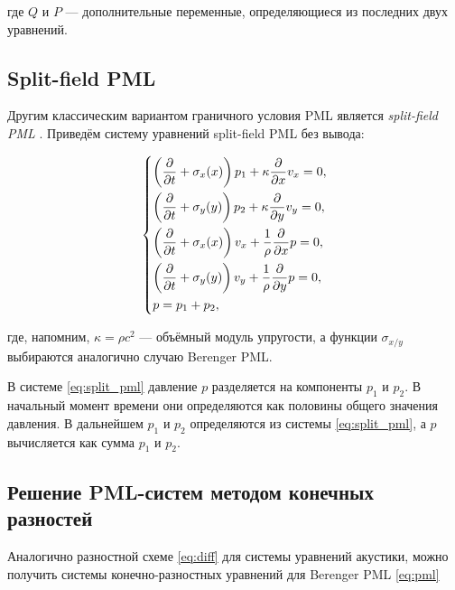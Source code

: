 \noindent где $Q$ и $P$ --- дополнительные переменные, определяющиеся из последних двух уравнений.
    
\subsection{Split-field PML}

Другим классическим вариантом граничного условия PML является  \textit{split-field PML} \cite{split_field_pml}. Приведём систему уравнений split-field PML без вывода:

\begin{equation}
	\begin{dcases}
	    \left(\frac{\partial}{\partial t} + \sigma_x(x)\right) p_1 + \kappa \frac{\partial}{\partial x} v_x = 0 , \\
	    \left(\frac{\partial}{\partial t} + \sigma_y(y)\right) p_2 + \kappa \frac{\partial}{\partial y} v_y = 0 , \\
	    \left(\frac{\partial}{\partial t} + \sigma_x(x)\right) v_x + \frac{1}{\rho} \frac{\partial}{\partial x} p = 0 , \\
	    \left(\frac{\partial}{\partial t} + \sigma_y(y)\right) v_y + \frac{1}{\rho} \frac{\partial}{\partial y} p = 0 , \\
	    p = p_1 + p_2 ,
	\end{dcases}\label{eq:split_pml} 
\end{equation}
    
\noindent где, напомним,  $\kappa = \rho c^2$ --- объёмный модуль упругости, а функции $\sigma_{x/y}$ выбираются аналогично случаю Berenger PML.

В системе \eqref{eq:split_pml} давление $p$ разделяется на  компоненты $p_1$ и $p_2$. В начальный момент времени они определяются как половины общего значения давления. В дальнейшем $p_1$ и $p_2$ определяются из системы  \eqref{eq:split_pml}, а $p$ вычисляется как сумма $p_1$ и $p_2$.
    
\subsection{Решение PML-систем методом конечных разностей}
    
Аналогично разностной схеме \eqref{eq:diff} для системы уравнений акустики, можно получить системы конечно-разностных уравнений для Berenger PML \eqref{eq:pml}
    

